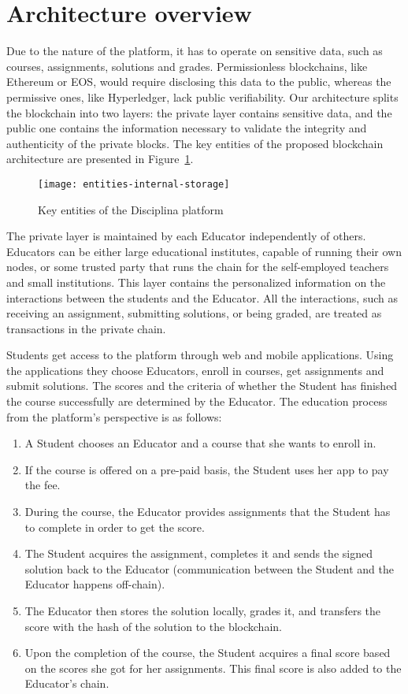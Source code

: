 \section{Architecture overview}
\label{sec:architecture}

Due to the nature of the platform, it has to operate on sensitive data, such as courses, assignments, solutions and grades. Permissionless blockchains, like Ethereum or EOS, would require disclosing this data to the public, whereas the permissive ones, like Hyperledger, lack public verifiability. Our architecture splits the blockchain into two layers: the private layer contains sensitive data, and the public one contains the information necessary to validate the integrity and authenticity of the private blocks. The key entities of the proposed blockchain architecture are presented in Figure~\ref{fig:entities}.

\begin{figure}[ht]
\centering
\texttt{[image: entities-internal-storage]}
\caption{Key entities of the Disciplina platform}
\label{fig:entities}
\end{figure}

The private layer is maintained by each Educator independently of others. Educators can be either large educational institutes, capable of running their own nodes, or some trusted party that runs the chain for the self-employed teachers and small institutions. This layer contains the personalized information on the interactions between the students and the Educator. All the interactions, such as receiving an assignment, submitting solutions, or being graded, are treated as transactions in the private chain.

Students get access to the platform through web and mobile applications. Using the applications they choose Educators, enroll in courses, get assignments and submit solutions. The scores and the criteria of whether the Student has finished the course successfully are determined by the Educator. The education process from the platform’s perspective is as follows:
\begin{enumerate}
\item A Student chooses an Educator and a course that she wants to enroll in.
\item If the course is offered on a pre-paid basis, the Student uses her app to pay the fee.
\item During the course, the Educator provides assignments that the Student has to complete in order to get the score.
\item The Student acquires the assignment, completes it and sends the signed solution back to the Educator (communication between the Student and the Educator happens off-chain).
\item The Educator then stores the solution locally, grades it,  and transfers the score with the hash of the solution to the blockchain.
\item Upon the completion of the course, the Student acquires a final score based on the scores she got for her assignments. This final score is also added to the Educator’s chain.
\end{enumerate}

